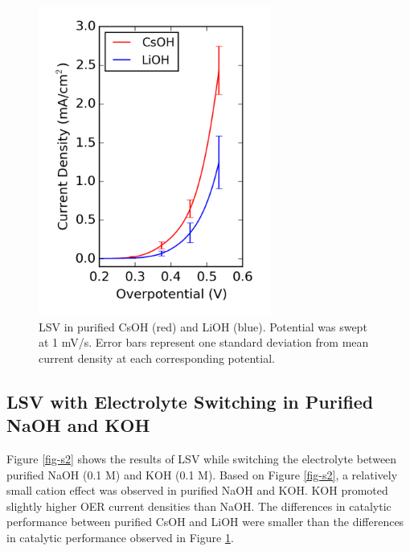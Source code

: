 \documentclass[journal=jpccck,manuscript=suppinfo,email=true]{achemso}
\begin{document}
\begin{figure}[h]
\centering
\includegraphics[width=3in]{./images/figures-supp-info/IvsV-Li-Cs-pure-10-08.png}
\caption{\label{fig-s1}LSV in purified CsOH (red) and LiOH (blue). Potential was swept at 1 mV/s. Error bars represent one standard deviation from mean current density at each corresponding potential.}
\end{figure}

\subsection{LSV with Electrolyte Switching in Purified NaOH and KOH}
\label{sec-2-2}
Figure \ref{fig-s2} shows the results of LSV while switching the electrolyte between purified NaOH (0.1 M) and KOH (0.1 M). Based on Figure \ref{fig-s2}, a relatively small cation effect was observed in purified NaOH and KOH. KOH promoted slightly higher OER current densities than NaOH. The differences in catalytic performance between purified CsOH and LiOH were smaller than the differences in catalytic performance observed in Figure \ref{fig-s1}.
\end{document}
